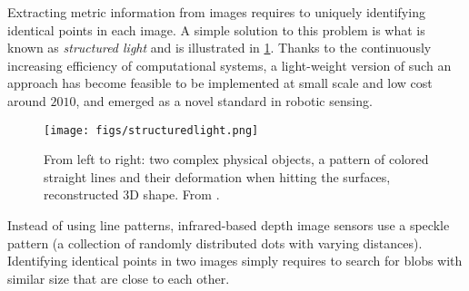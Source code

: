 

Extracting metric information from images requires to uniquely identifying identical points in each image. A simple solution to this problem is what is known as \textsl{structured light} and is illustrated in \cref{fig:struclight}.
%
Thanks to the continuously increasing efficiency of computational systems, a light-weight version of such an approach has become feasible to be implemented at small scale and low cost around $2010$, and emerged as a novel standard in robotic sensing.

\begin{figure}
	\centering
		\texttt{[image: figs/structuredlight.png]}
	\caption{From left to right: two complex physical objects, a pattern of colored straight lines and their deformation when hitting the surfaces, reconstructed 3D shape. From \protect\cite{zhang2002rapid}.}
	\label{fig:struclight}
\end{figure}

Instead of using line patterns, infrared-based depth image sensors use a speckle pattern (a collection of randomly distributed dots with varying distances).
Identifying identical points in two images simply requires to search for blobs with similar size that are close to each other.


